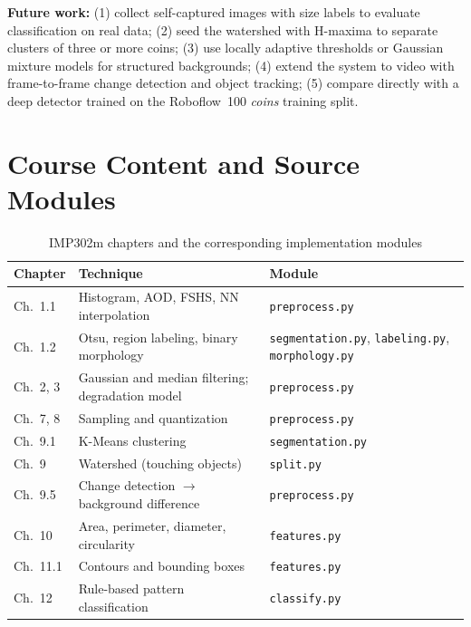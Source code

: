 \documentclass[conference,a4paper]{IEEEtran}
\newcommand{\cfg}[1]{\texttt{#1}}
\begin{document}
\textbf{Future work:} (1) collect self-captured images with size labels to evaluate classification on real data; (2) seed the watershed with H-maxima to separate clusters of three or more coins; (3) use locally adaptive thresholds or Gaussian mixture models for structured backgrounds; (4) extend the system to video with frame-to-frame change detection and object tracking; (5) compare directly with a deep detector trained on the Roboflow~100 \emph{coins} training split.

\appendices
\section{Course Content and Source Modules}
\begin{table}[!h]
\centering
\caption{IMP302m chapters and the corresponding implementation modules}
\label{tab:mapping}
\footnotesize
\setlength{\tabcolsep}{3pt}
\begin{tabular}{@{}p{1.75cm}p{3.75cm}p{2.4cm}@{}}
\toprule
Chapter & Technique & Module\\
\midrule
Ch.~1.1 & Histogram, AOD, FSHS, NN interpolation & \cfg{preprocess.py}\\
Ch.~1.2 & Otsu, region labeling, binary morphology & \cfg{segmentation.py}, \cfg{labeling.py}, \cfg{morphology.py}\\
Ch.~2, 3 & Gaussian and median filtering; degradation model & \cfg{preprocess.py}\\
Ch.~7, 8 & Sampling and quantization & \cfg{preprocess.py}\\
Ch.~9.1 & K-Means clustering & \cfg{segmentation.py}\\
Ch.~9 & Watershed (touching objects) & \cfg{split.py}\\
Ch.~9.5 & Change detection $\rightarrow$ background difference & \cfg{preprocess.py}\\
Ch.~10 & Area, perimeter, diameter, circularity & \cfg{features.py}\\
Ch.~11.1 & Contours and bounding boxes & \cfg{features.py}\\
Ch.~12 & Rule-based pattern classification & \cfg{classify.py}\\
\bottomrule
\end{tabular}
\end{table}
\end{document}
